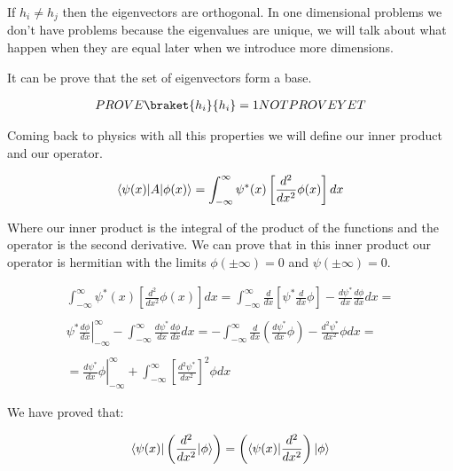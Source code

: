 If $h_i\neq h_j$ then the eigenvectors are orthogonal. In one dimensional problems we don't have problems because the eigenvalues are unique, we will talk about what happen when they are equal later when we introduce more dimensions.

It can be prove that the set of eigenvectors form a base.

\begin{equation}
  \begin{array}{c}
    PROVE \braket{h_i}{h_i} = 1 NOT PROVE YET
  \end{array}
\end{equation}

Coming back to physics with all this properties we will define our inner product and our operator.

\begin{equation}
  \langle\psi(x)\rvert A\lvert\phi(x)\rangle = \int_{-\infty}^{\infty}\psi^*(x)\left[\frac{d^2}{dx^2}\phi(x)\right]dx
\end{equation}

Where our inner product is the integral of the product of the functions and the operator is the second derivative. We can prove that in this inner product our operator is hermitian with the limits $\phi(\pm \infty) = 0$ and $\psi(\pm \infty) = 0$.

\begin{equation}
  \begin{array}{c}
    \int_{-\infty}^{\infty}\psi^*(x)\left[\frac{d^2}{dx^2}\phi(x)\right] dx = \int_{-\infty}^{\infty} \frac{d}{dx}\left[\psi^*\frac{d}{dx}\phi\right]-\frac{d\psi^*}{dx}\frac{d\phi}{dx} dx =
    \\

    \\
    \left.\psi^*\frac{d\phi}{dx}\right|_{-\infty}^{\infty} - \int_{-\infty}^{\infty} \frac{d\psi^*}{dx}\frac{d\phi}{dx} dx = -\int_{-\infty}^{\infty} \frac{d}{dx}\left(\frac{d\psi^*}{dx}\phi\right)-\frac{d^2\psi^*}{dx^2}\phi dx =
    \\

    \\
    =\left.\frac{d\psi^*}{dx}\phi\right|_{-\infty}^{\infty} + \int_{-\infty}^{\infty} \left[\frac{d^2\psi^*}{dx^2}\right]^2\phi dx
  \end{array}
\end{equation}

We have proved that:

\begin{equation}
  \langle\psi(x)\rvert\left(\frac{d^2}{dx^2}\lvert\phi\rangle\right) = \left(\langle\psi(x)\rvert\frac{d^2}{dx^2}\right)\lvert\phi\rangle
\end{equation}

